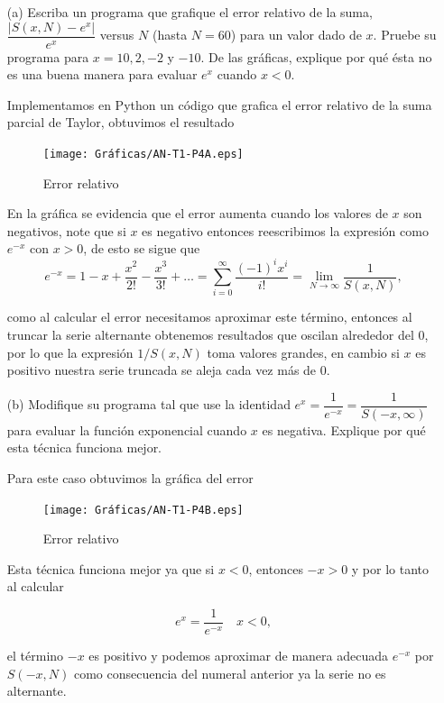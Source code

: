 \documentclass[12pt, a4paper]{article}%
\begin{document}
\begin{itemize}
    \item[(a)] Escriba un programa que grafique el error relativo de la suma, \( \dfrac{|S(x, N) - e^x|}{e^x} \) versus \( N \) (hasta \( N = 60 \)) para un valor dado de \( x \). Pruebe su programa para \( x = 10, 2, -2 \) y \( -10 \). De las gráficas, explique por qué ésta no es una buena manera para evaluar \( e^x \) cuando \( x < 0 \).

    \begin{solution}

    Implementamos en Python un código que grafica el error relativo de la suma parcial de Taylor, obtuvimos el resultado

    \begin{figure}[H]
        \centering
        \texttt{[image: Gráficas/AN-T1-P4A.eps]}
        \caption{Error relativo}
        \label{coyo4}
    \end{figure}

En la gráfica se evidencia que el error aumenta cuando los valores de $x$ son negativos, note que si $x$ es negativo entonces reescribimos la expresión como $e^{-x}$ con $x>0$, de esto se sigue que
\[
e^{-x} = 1 -x + \frac{x^2}{2!} - \frac{x^3}{3!} + \dots = \sum_{i=0}^{\infty} \frac{(-1)^ix^i}{i!} = \lim_{N \to \infty} \dfrac{1}{S(x,N)},
\]

como al calcular el error necesitamos aproximar este término, entonces al truncar la serie alternante obtenemos resultados que oscilan alrededor del 0, por lo que la expresión $1/S(x,N)$ toma valores grandes, en cambio si $x$ es positivo nuestra serie truncada se aleja cada vez más de 0.
    \end{solution}
    
    \item[(b)] Modifique su programa tal que use la identidad \( e^x = \dfrac{1}{e^{-x}} = \dfrac{1}{S(-x, \infty)} \) para evaluar la función exponencial cuando \( x \) es negativa. Explique por qué esta técnica funciona mejor.

\begin{solution}
    Para este caso obtuvimos la gráfica del error

    \begin{figure}[H]
        \centering
        \texttt{[image: Gráficas/AN-T1-P4B.eps]}
        \caption{Error relativo}
        \label{coyo4B}
    \end{figure}

    Esta técnica funciona mejor ya que si $x<0$, entonces $-x>0$ y por lo tanto al calcular 

    $$e^x=\dfrac{1}{e^{-x}}\quad x<0,$$

    el término $-x$ es positivo y podemos aproximar de manera adecuada $e^{-x}$ por $S(-x,N)$ como consecuencia del numeral anterior ya la serie no es alternante.
\end{solution}
    
\end{itemize}
\end{document}
